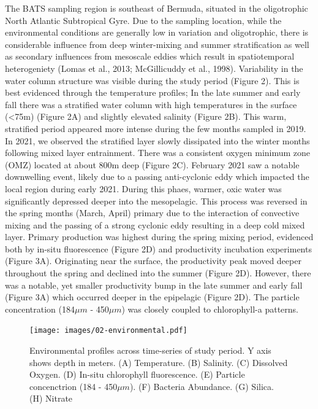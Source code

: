 \documentclass[
]{article}
\begin{document}
The BATS sampling region is southeast of Bermuda, situated in the
oligotrophic North Atlantic Subtropical Gyre. Due to the sampling
location, while the environmental conditions are generally low in
variation and oligotrophic, there is considerable influence from deep
winter-mixing and summer stratification as well as secondary influences
from mesoscale eddies which result in spatiotemporal heterogeniety
(Lomas et al., 2013; McGillicuddy et al., 1998). Variability in the
water column structure was visible during the study period (Figure 2).
This is best evidenced through the temperature profiles; In the late
summer and early fall there was a stratified water column with high
temperatures in the surface (\textless75m) (Figure 2A) and slightly
elevated salinity (Figure 2B). This warm, stratified period appeared
more intense during the few months sampled in 2019. In 2021, we observed
the stratified layer slowly dissipated into the winter months following
mixed layer entrainment. There was a consistent oxygen minimum zone
(OMZ) located at about 800m deep (Figure 2C). February 2021 saw a
notable downwelling event, likely due to a passing anti-cyclonic eddy
which impacted the local region during early 2021. During this phaes,
warmer, oxic water was significantly depressed deeper into the
mesopelagic. This process was reversed in the spring months (March,
April) primary due to the interaction of convective mixing and the
passing of a strong cyclonic eddy resulting in a deep cold mixed layer.
Primary production was highest during the spring mixing period,
evidenced both by in-situ fluorescence (Figure 2D) and productivity
incubation experiments (Figure 3A). Originating near the surface, the
productivity peak moved deeper throughout the spring and declined into
the summer (Figure 2D). However, there was a notable, yet smaller
productivity bump in the late summer and early fall (Figure 3A) which
occurred deeper in the epipelagic (Figure 2D). The particle
concentration (184\(\mu m\) - 450\(\mu m\)) was closely coupled to
chlorophyll-a patterns.

\begin{figure}

{\centering \texttt{[image: images/02-environmental.pdf]}

}

\caption{Environmental profiles across time-series of study period. Y
axis shows depth in meters. (A) Temperature. (B) Salinity. (C) Dissolved
Oxygen. (D) In-situ chlorophyll fluorescence. (E) Particle concenctrion
(184 - 450\(\mu m\)). (F) Bacteria Abundance. (G) Silica. (H) Nitrate}

\end{figure}
\end{document}

